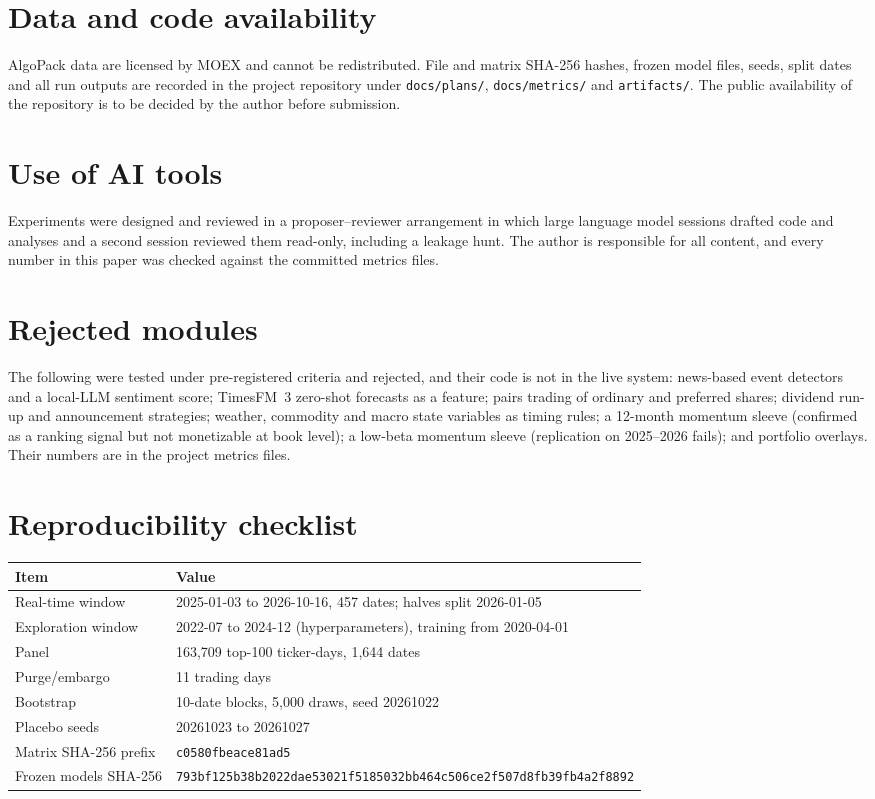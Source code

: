 \documentclass[11pt]{article}
\begin{document}
\section*{Data and code availability}
AlgoPack data are licensed by MOEX and cannot be redistributed. File and matrix SHA-256 hashes, frozen model files, seeds, split dates and all run outputs are recorded in the project repository under \texttt{docs/plans/}, \texttt{docs/metrics/} and \texttt{artifacts/}. The public availability of the repository is to be decided by the author before submission.

\section*{Use of AI tools}
Experiments were designed and reviewed in a proposer--reviewer arrangement in which large language model sessions drafted code and analyses and a second session reviewed them read-only, including a leakage hunt. The author is responsible for all content, and every number in this paper was checked against the committed metrics files.

\appendix
\section{Rejected modules}
The following were tested under pre-registered criteria and rejected, and their code is not in the live system: news-based event detectors and a local-LLM sentiment score; TimesFM~3 zero-shot forecasts as a feature; pairs trading of ordinary and preferred shares; dividend run-up and announcement strategies; weather, commodity and macro state variables as timing rules; a 12-month momentum sleeve (confirmed as a ranking signal but not monetizable at book level); a low-beta momentum sleeve (replication on 2025--2026 fails); and portfolio overlays. Their numbers are in the project metrics files.

\section{Reproducibility checklist}
\begin{tabular}{p{4.2cm}p{9.2cm}}
\toprule
Item & Value \\
\midrule
Real-time window & 2025-01-03 to 2026-10-16, 457 dates; halves split 2026-01-05 \\
Exploration window & 2022-07 to 2024-12 (hyperparameters), training from 2020-04-01 \\
Panel & 163{,}709 top-100 ticker-days, 1{,}644 dates \\
Purge/embargo & 11 trading days \\
Bootstrap & 10-date blocks, 5{,}000 draws, seed 20261022 \\
Placebo seeds & 20261023 to 20261027 \\
Matrix SHA-256 prefix & \texttt{c0580fbeace81ad5} \\
Frozen models SHA-256 & \texttt{793bf125b38b2022dae53021f5185032bb464c506ce2f507d8fb39fb4a2f8892} \\
\bottomrule
\end{tabular}
\end{document}
